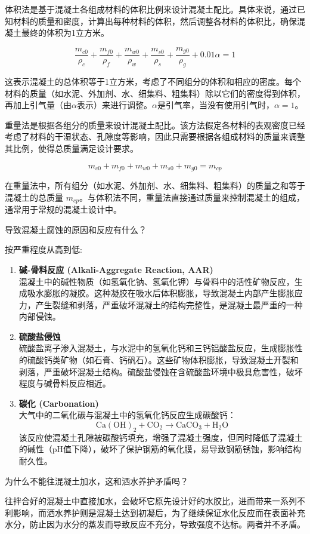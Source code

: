 \documentclass[12pt, a4paper, oneside, UTF8]{ctexbook}
\begin{document}
体积法是基于混凝土各组成材料的体积比例来设计混凝土配比。具体来说，通过已知材料的质量和密度，计算出每种材料的体积，然后调整各材料的体积比，确保混凝土最终的体积为1立方米。

\begin{equation}
\frac{m_{c0}}{\rho_c} + \frac{m_{f0}}{\rho_f} + \frac{m_{w0}}{\rho_w} + \frac{m_{s0}}{\rho_s} + \frac{m_{g0}}{\rho_g} + 0.01\alpha = 1
\end{equation}

这表示混凝土的总体积等于1立方米，考虑了不同组分的体积和相应的密度。每个材料的质量（如水泥、外加剂、水、细集料、粗集料）除以它们的密度得到体积，再加上引气量（由$\alpha$表示）来进行调整。$\alpha$是引气率，当没有使用引气时，$\alpha=1$。

重量法是根据各组分的质量来设计混凝土配比。该方法假定各材料的表观密度已经考虑了材料的干湿状态、孔隙度等影响，因此只需要根据各组成材料的质量来调整其比例，使得总质量满足设计要求。

\begin{equation}
m_{c0} + m_{f0} + m_{w0} + m_{s0} + m_{g0} = m_{cp}
\end{equation}

在重量法中，所有组分（如水泥、外加剂、水、细集料、粗集料）的质量之和等于混凝土的总质量 $m_{cp}$。与体积法不同，重量法直接通过质量来控制混凝土的组成，通常用于常规的混凝土设计中。

\begin{example}
    导致混凝土腐蚀的原因和反应有什么？

    按严重程度从高到低:

    \begin{enumerate}
    \item \textbf{碱-骨料反应 (Alkali-Aggregate Reaction, AAR)}\\
    混凝土中的碱性物质（如氢氧化钠、氢氧化钾）与骨料中的活性矿物反应，生成吸水膨胀的凝胶。这种凝胶在吸水后体积膨胀，导致混凝土内部产生膨胀应力，产生裂缝和剥落，严重破坏混凝土的结构完整性，是混凝土最严重的一种内部侵蚀。

    \item \textbf{硫酸盐侵蚀}\\
    硫酸盐离子渗入混凝土，与水泥中的氢氧化钙和三钙铝酸盐反应，生成膨胀性的硫酸钙类矿物（如石膏、钙矾石）。这些矿物体积膨胀，导致混凝土开裂和剥落，严重破坏混凝土结构。硫酸盐侵蚀在含硫酸盐环境中极具危害性，破坏程度与碱骨料反应相近。

    \item \textbf{碳化 (Carbonation)}\\
    大气中的二氧化碳与混凝土中的氢氧化钙反应生成碳酸钙：
    \[
    \mathrm{Ca(OH)_2 + CO_2 \rightarrow CaCO_3 + H_2O}
    \]
    该反应使混凝土孔隙被碳酸钙填充，增强了混凝土强度，但同时降低了混凝土的碱性（pH值下降），破坏了保护钢筋的氧化膜，易导致钢筋锈蚀，影响结构耐久性。
\end{enumerate}
\end{example}

\begin{example}
    为什么不能往混凝土加水，这和洒水养护矛盾吗？

往拌合好的混凝土中直接加水，会破坏它原先设计好的水胶比，进而带来一系列不利影响，而洒水养护则是混凝土达到初凝后，为了继续保证水化反应而在表面补充水分，防止因为水分的蒸发而导致反应不充分，导致强度不达标。两者并不矛盾。
\end{example}


\ifx\allfiles\undefined
\end{document}
